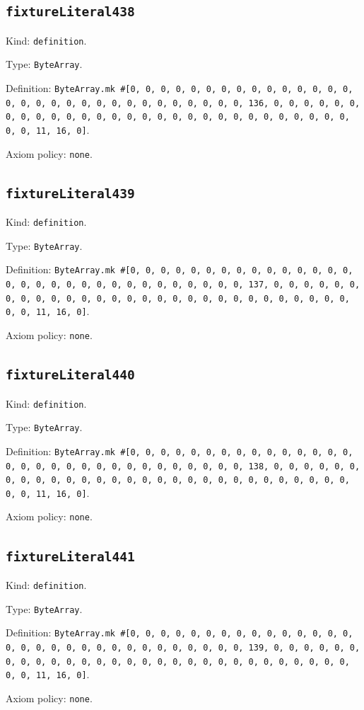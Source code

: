 \documentclass[11pt]{article}
\begin{document}
\subsection*{\texttt{fixtureLiteral438}}
\noindent Kind: \texttt{definition}.\par
\noindent Type: \texttt{ByteArray}.\par
\noindent Definition: \texttt{ByteArray.mk \#[0, 0, 0, 0, 0, 0, 0, 0, 0, 0, 0, 0, 0, 0, 0, 0, 0, 0, 0, 0, 0, 0, 0, 0, 0, 0, 0, 0, 0, 0, 0, 136, 0, 0, 0, 0, 0, 0, 0, 0, 0, 0, 0, 0, 0, 0, 0, 0, 0, 0, 0, 0, 0, 0, 0, 0, 0, 0, 0, 0, 0, 0, 0, 11, 16, 0]}.\par
\noindent Axiom policy: \texttt{none}.\par
\subsection*{\texttt{fixtureLiteral439}}
\noindent Kind: \texttt{definition}.\par
\noindent Type: \texttt{ByteArray}.\par
\noindent Definition: \texttt{ByteArray.mk \#[0, 0, 0, 0, 0, 0, 0, 0, 0, 0, 0, 0, 0, 0, 0, 0, 0, 0, 0, 0, 0, 0, 0, 0, 0, 0, 0, 0, 0, 0, 0, 137, 0, 0, 0, 0, 0, 0, 0, 0, 0, 0, 0, 0, 0, 0, 0, 0, 0, 0, 0, 0, 0, 0, 0, 0, 0, 0, 0, 0, 0, 0, 0, 11, 16, 0]}.\par
\noindent Axiom policy: \texttt{none}.\par
\subsection*{\texttt{fixtureLiteral440}}
\noindent Kind: \texttt{definition}.\par
\noindent Type: \texttt{ByteArray}.\par
\noindent Definition: \texttt{ByteArray.mk \#[0, 0, 0, 0, 0, 0, 0, 0, 0, 0, 0, 0, 0, 0, 0, 0, 0, 0, 0, 0, 0, 0, 0, 0, 0, 0, 0, 0, 0, 0, 0, 138, 0, 0, 0, 0, 0, 0, 0, 0, 0, 0, 0, 0, 0, 0, 0, 0, 0, 0, 0, 0, 0, 0, 0, 0, 0, 0, 0, 0, 0, 0, 0, 11, 16, 0]}.\par
\noindent Axiom policy: \texttt{none}.\par
\subsection*{\texttt{fixtureLiteral441}}
\noindent Kind: \texttt{definition}.\par
\noindent Type: \texttt{ByteArray}.\par
\noindent Definition: \texttt{ByteArray.mk \#[0, 0, 0, 0, 0, 0, 0, 0, 0, 0, 0, 0, 0, 0, 0, 0, 0, 0, 0, 0, 0, 0, 0, 0, 0, 0, 0, 0, 0, 0, 0, 139, 0, 0, 0, 0, 0, 0, 0, 0, 0, 0, 0, 0, 0, 0, 0, 0, 0, 0, 0, 0, 0, 0, 0, 0, 0, 0, 0, 0, 0, 0, 0, 11, 16, 0]}.\par
\noindent Axiom policy: \texttt{none}.\par
\end{document}
